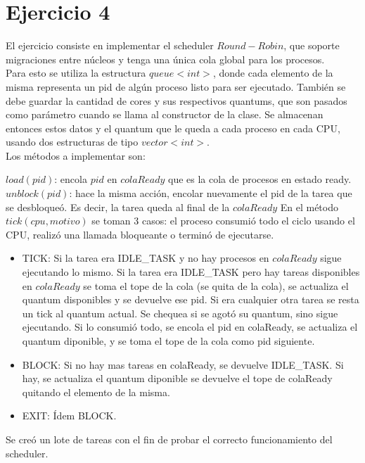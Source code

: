 \section{Ejercicio 4}

El ejercicio consiste en implementar el scheduler $Round-Robin$, que soporte migraciones entre núcleos y tenga una única cola global
para los procesos. \\

Para esto se utiliza la estructura $queue<int>$, donde cada elemento de la misma representa un pid de algún proceso listo para ser ejecutado.
También se debe guardar la cantidad de cores y sus respectivos quantums, que son pasados como parámetro cuando se llama al constructor de la clase. 
Se almacenan entonces estos datos y el quantum que le queda a cada proceso en cada CPU, usando dos estructuras de tipo $vector<int>$.\\

Los métodos a implementar son:
 
$load(pid)$: encola $pid$ en $colaReady$ que es la cola de procesos en estado ready.
$unblock(pid)$: hace la misma acción, encolar nuevamente el pid de la tarea que se desbloqueó. Es decir, la tarea queda al final de la $colaReady$
En el método $tick(cpu, motivo)$ se toman 3 casos: el proceso consumió todo el ciclo usando el CPU, realizó una llamada bloqueante o terminó
 de ejecutarse. \\

\begin{itemize}
\item TICK: Si la tarea era IDLE_TASK y no hay procesos en $colaReady$ sigue ejecutando lo mismo.
			Si la tarea era IDLE_TASK pero hay tareas disponibles en $colaReady$ se toma el tope de la cola (se quita de la cola), se actualiza el quantum disponibles
			 y se devuelve ese pid.
			Si era cualquier otra tarea se resta un tick al quantum actual. Se chequea si se agotó su quantum, sino sigue ejecutando. Si lo consumió todo, se encola 
			el pid en colaReady, se actualiza el quantum diponible, y se toma el tope de la cola como pid siguiente.
\item BLOCK: Si no hay mas tareas en colaReady, se devuelve IDLE_TASK.
				Si hay, se actualiza el quantum diponible se devuelve el tope de colaReady quitando el elemento de la misma.
\item EXIT: Ídem BLOCK.
\end{itemize}

Se creó un lote de tareas con el fin de probar el correcto funcionamiento del scheduler.

